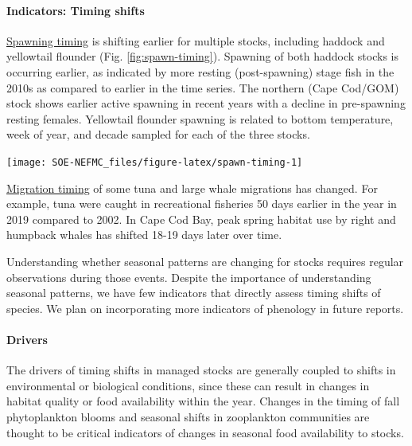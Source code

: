 \documentclass[
  10pt,
]{article}
\let\origfigure\figure
\let\endorigfigure\endfigure
\renewenvironment{figure}[1][2] {
    \expandafter\origfigure\expandafter[H]
} {
    \endorigfigure
}
\begin{document}
\hypertarget{indicators-timing-shifts}{%
\paragraph{Indicators: Timing shifts}\label{indicators-timing-shifts}}

\href{https://noaa-edab.github.io/catalog/spawning-timing.html}{Spawning timing} is shifting earlier for multiple stocks, including haddock and yellowtail flounder (Fig. \ref{fig:spawn-timing}). Spawning of both haddock stocks is occurring earlier, as indicated by more resting (post-spawning) stage fish in the 2010s as compared to earlier in the time series. The northern (Cape Cod/GOM) stock shows earlier active spawning in recent years with a decline in pre-spawning resting females. Yellowtail flounder spawning is related to bottom temperature, week of year, and decade sampled for each of the three stocks.

\begin{figure}

{\centering \texttt{[image: SOE-NEFMC\_files/figure-latex/spawn-timing-1]} 

}

\caption{Percent resting stage (non-spawning) fish from two haddock and three yellowtail flounder stocks: CC = Cape Cod Gulf of Maine, GOM = Gulf of Maine, GB = Georges Bank, SNE = Southern New England.}\label{fig:spawn-timing}
\end{figure}

\href{https://noaa-edab.github.io/catalog/timing-shifts-risks-to-seasonal-management.html}{Migration timing} of some tuna and large whale migrations has changed. For example, tuna were caught in recreational fisheries 50 days earlier in the year in 2019 compared to 2002. In Cape Cod Bay, peak spring habitat use by right and humpback whales has shifted 18-19 days later over time.

Understanding whether seasonal patterns are changing for stocks requires regular observations during those events. Despite the importance of understanding seasonal patterns, we have few indicators that directly assess timing shifts of species. We plan on incorporating more indicators of phenology in future reports.

\hypertarget{drivers-1}{%
\paragraph{Drivers}\label{drivers-1}}

The drivers of timing shifts in managed stocks are generally coupled to shifts in environmental or biological conditions, since these can result in changes in habitat quality or food availability within the year. Changes in the timing of fall phytoplankton blooms and seasonal shifts in zooplankton communities are thought to be critical indicators of changes in seasonal food availability to stocks.
\end{document}
